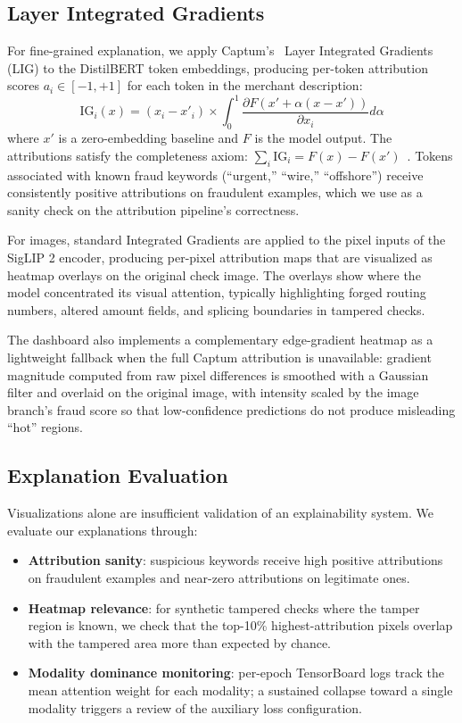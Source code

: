 \documentclass[10pt,conference,letterpaper]{IEEEtran}
\begin{document}
\subsection{Layer Integrated Gradients}

For fine-grained explanation, we apply Captum's~\cite{Captum} Layer Integrated
Gradients (LIG) to the DistilBERT token embeddings, producing per-token attribution
scores $a_i \in [-1, +1]$ for each token in the merchant description:
\begin{equation}
\text{IG}_i(x) = (x_i - x'_i) \times \int_0^1 \frac{\partial F(x' + \alpha(x-x'))}{\partial x_i} d\alpha
\end{equation}
where $x'$ is a zero-embedding baseline and $F$ is the model output. The attributions
satisfy the completeness axiom: $\sum_i \text{IG}_i = F(x) - F(x')$~\cite{IntGradients}.
Tokens associated with known fraud keywords (``urgent,'' ``wire,'' ``offshore'') receive
consistently positive attributions on fraudulent examples, which we use as a sanity
check on the attribution pipeline's correctness.

For images, standard Integrated Gradients are applied to the pixel inputs of the SigLIP
2 encoder, producing per-pixel attribution maps that are visualized as heatmap overlays
on the original check image. The overlays show where the model concentrated its visual
attention, typically highlighting forged routing numbers, altered amount fields, and
splicing boundaries in tampered checks.

The dashboard also implements a complementary edge-gradient heatmap as a lightweight
fallback when the full Captum attribution is unavailable: gradient magnitude computed
from raw pixel differences is smoothed with a Gaussian filter and overlaid on the
original image, with intensity scaled by the image branch's fraud score so that
low-confidence predictions do not produce misleading ``hot'' regions.

\subsection{Explanation Evaluation}

Visualizations alone are insufficient validation of an explainability system. We evaluate
our explanations through:
\begin{itemize}
  \item \textbf{Attribution sanity}: suspicious keywords receive high positive
  attributions on fraudulent examples and near-zero attributions on legitimate ones.
  \item \textbf{Heatmap relevance}: for synthetic tampered checks where the tamper
  region is known, we check that the top-10\% highest-attribution pixels overlap with
  the tampered area more than expected by chance.
  \item \textbf{Modality dominance monitoring}: per-epoch TensorBoard logs track the
  mean attention weight for each modality; a sustained collapse toward a single modality
  triggers a review of the auxiliary loss configuration.
\end{itemize}
\end{document}
